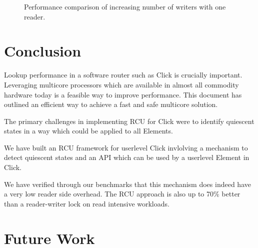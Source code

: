 \documentclass[a4paper,marginparwidth=50pt,marginparsep=10pt]{article}
\begin{document}
\begin{figure}[tph]
\begin{center}
\caption{Performance comparison of increasing number of writers with one reader.}
\label{img:micro_1r_vw}
\end{center}
\end{figure}


\section{Conclusion}
Lookup performance in a software router such as Click is crucially
important. Leveraging multicore processors which are available in almost all commodity hardware
today is a feasible way to improve performance. This document has outlined an efficient way to achieve a fast and safe multicore solution.


The primary challenges in implementing RCU for Click were to
identify quiescent states in a way which could be applied to all
Elements. 

We have built an RCU framework for userlevel Click invlolving a
mechanism to detect quiescent states and an API which can be used by
a userlevel Element in Click.

We have verified through our benchmarks that
this mechanism does indeed have a very low reader side overhead. The RCU approach is also up to 70\% better than a reader-writer lock on read intensive workloads.

\section{Future Work}
\end{document}

